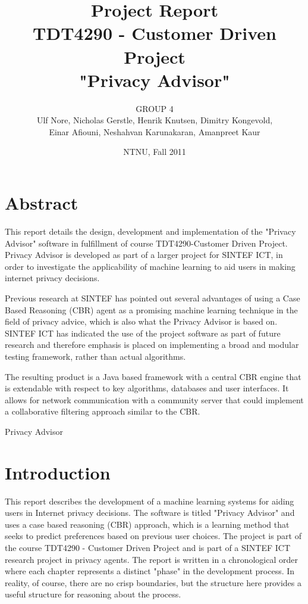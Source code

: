 \documentclass[11pt]{book}
\title{Project Report\\
TDT4290 - Customer Driven Project \\ 
"Privacy Advisor"}
\author{GROUP 4\\
Ulf Nore, Nicholas Gerstle, Henrik Knutsen, Dimitry Kongevold,\\ 
Einar Afiouni, Neshahvan Karunakaran, Amanpreet Kaur}
\date{NTNU, Fall 2011}
\begin{document}
\frontmatter
\maketitle

\chapter*{\centering Abstract}
This report details the design, development and implementation of the
"Privacy Advisor" software in fulfillment of course TDT4290-Customer
Driven Project. Privacy Advisor is developed as part of a larger project for SINTEF ICT, in
order to investigate the applicability of machine learning to aid users in
making internet privacy decisions. 

Previous research at SINTEF has pointed
out several advantages of using a Case Based Reasoning (CBR) agent as
a promising machine learning technique in the field of privacy advice,
which is also what the Privacy Advisor is based on. SINTEF ICT
has indicated the use of the project software as part of future
research and therefore emphasis is placed on implementing a broad
and modular testing framework, rather than actual algorithms.

The resulting product is a Java based framework with a central CBR
engine that is extendable with respect to key algorithms, databases
and user interfaces. It allows for network communication with a
community server that could implement a collaborative filtering approach 
similar to the CBR.

Privacy Advisor 




\listoftables

\listoffigures

\tableofcontents \label{toc}



\chapter{Introduction}

This report describes the development of a machine learning systems for aiding users in Internet privacy decisions. The software is titled "Privacy Advisor" and uses a case based reasoning (CBR) approach, which is a learning method that seeks to predict preferences based on previous user choices. The project is part of the course TDT4290 - Customer Driven Project and is part of a SINTEF ICT research project in privacy agents. The report is written in a chronological order where each chapter represents a distinct "phase" in the development process. In reality, of course, there are no crisp boundaries, but the structure here provides a useful structure for reasoning about the process. 
\end{document}
